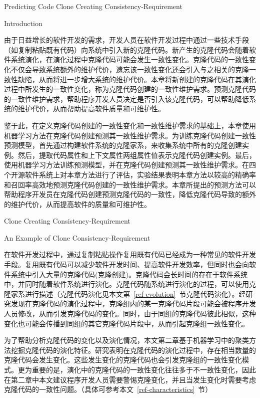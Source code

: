 
{Predicting Code Clone Creating Consistency-Requirement}

{Introduction}

由于日益增长的软件开发的需求，开发人员在软件开发过程中通过一些技术手段（如复制粘贴既有代码）向系统中引入新的克隆代码。新产生的克隆代码会随着软件系统演化，在演化过程中克隆代码可能会发生一致性变化。克隆代码的一致性变化不仅会导致系统额外的维护代价，遗忘该一致性变化还会引入与之相关的克隆一致性缺陷，从而将进一步增大系统的维护代价。本章将新创建的克隆代码在其演化过程中所发生的一致性变化，称为克隆代码创建的一致性维护需求。预测克隆代码的一致性维护需求，帮助程序开发人员决定是否引入该克隆代码，可以帮助降低系统的维护代价，从而帮助提高软件质量和可维护性。

鉴于此，在定义克隆代码创建的一致性变化和一致性维护需求的基础上，本章使用机器学习方法在克隆代码创建预测其一致性维护需求。为训练克隆代码创建一致性预测模型，首先通过构建软件系统的克隆家系，来收集系统中所有的克隆创建实例。然后，提取代码属性和上下文属性两组属性值表示克隆代码创建实例。最后，使用机器学习方法训练预测模型，并在克隆代码创建预测其一致性维护需求。在四个开源软件系统上对本章方法进行了评估，实验结果表明本章方法以较高的精确率和召回率高效地预测克隆代码创建的一致性维护需求。本章所提出的预测方法可以帮助程序开发员在克隆代码创建预测克隆代码的一致性，降低克隆代码导致的额外的维护代价，从而提高软件的质量和可维护性。

{Clone Creating Consistency-Requirement}

{An Example of Clone Consistency-Requirement}

在软件开发过程中，通过复制粘贴操作复用既有代码已经成为一种常见的软件开发手段\cite{koschke2007survey}。复用既有代码可以减少软件开发时间、提高软件开发效率，但同时也会向软件系统中引入大量的克隆代码(克隆创建)。克隆代码会长时间的存在于软件系统中，并同时随着软件系统进行演化。克隆代码随系统进行演化的过程，可以使用克隆家系进行描述\cite{kim2005empirical}（克隆代码演化见本文第~\ref{ref-evolution}~节克隆代码演化）。经研究发现在克隆代码的演化过程中，克隆组内的某一克隆代码片段可能会被程序开发人员修改，从而引发克隆代码的变化。同时，由于同组的克隆代码彼此相似，这种变化也可能会传播到同组的其它克隆代码片段中，从而引起克隆组一致性变化\cite{saha2011automatic}。

为了帮助分析克隆代码的变化以及演化情况，本文第二章基于机器学习中的聚类方法挖掘克隆代码的演化特征。研究表明在克隆代码的演化过程中，存在相当数量的克隆代码会发生变化。这些发生变化的克隆代码也会引发克隆组的一致性变化模式。更为重要的是，演化中的克隆代码的一致性变化往往多于不一致性变化，因此在第二章中本文建议程序开发人员需要警惕克隆变化，并且当发生变化时需要考虑克隆代码的一致性问题。（具体可参考本文~\ref{ref-characteristics}~节）

